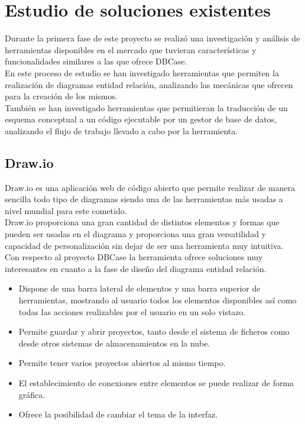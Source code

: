 \chapter{Estudio de soluciones existentes}
Durante la primera fase de este proyecto se realizó una investigación y análisis de herramientas disponibles en el mercado que tuvieran características y funcionalidades similares a las que ofrece DBCase.\\

En este proceso de estudio se han investigado herramientas que permiten la realización de diagramas entidad relación, analizando las mecánicas que ofrecen para la creación de los mismos.\\

También se han investigado herramientas que permitieran la traducción de un esquema conceptual a un código ejecutable por un gestor de base de datos, analizando el flujo de trabajo llevado a cabo por la herramienta.
\section{Draw.io}

Draw.io \cite{drawio} es una aplicación web de código abierto que permite realizar de manera sencilla todo tipo de diagramas siendo una de las herramientas más usadas a nivel mundial para este cometido.\\

Draw.io proporciona una gran cantidad de distintos elementos y formas que pueden ser usadas en el diagrama y proporciona una gran versatilidad y capacidad de personalización sin dejar de ser una herramienta muy intuitiva.\\

Con respecto al proyecto DBCase la herramienta ofrece soluciones muy interesantes en cuanto a la fase de diseño del diagrama entidad relación.\\

\begin{itemize}
    \item Dispone de una barra lateral de elementos y una barra superior de herramientas, mostrando al usuario todos los elementos disponibles así como todas las acciones realizables por el usuario en un solo vistazo.
    \item Permite guardar y abrir proyectos, tanto desde el sistema de ficheros como desde otros sistemas de almacenamientos en la nube.
    \item Permite tener varios proyectos abiertos al mismo tiempo.
    \item El establecimiento de conexiones entre elementos se puede realizar de forma gráfica.
    \item Ofrece la posibilidad de cambiar el tema de la interfaz.
\end{itemize}
